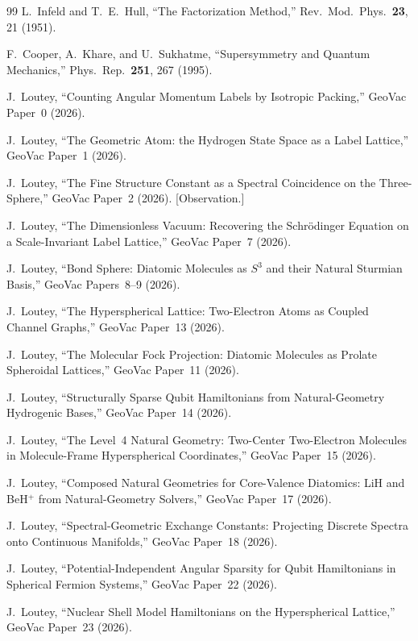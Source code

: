 \documentclass[twocolumn,pra,amsmath,amssymb,superscriptaddress]{revtex4-2}
\begin{document}
\begin{thebibliography}{99}
L.~Infeld and T.~E.~Hull,
``The Factorization Method,''
Rev.\ Mod.\ Phys.\ \textbf{23}, 21 (1951).

F.~Cooper, A.~Khare, and U.~Sukhatme,
``Supersymmetry and Quantum Mechanics,''
Phys.\ Rep.\ \textbf{251}, 267 (1995).

J.~Loutey,
``Counting Angular Momentum Labels by Isotropic Packing,''
GeoVac Paper~0 (2026).

J.~Loutey,
``The Geometric Atom: the Hydrogen State Space as a Label Lattice,''
GeoVac Paper~1 (2026).

J.~Loutey,
``The Fine Structure Constant as a Spectral Coincidence on the
Three-Sphere,''
GeoVac Paper~2 (2026). [Observation.]

J.~Loutey,
``The Dimensionless Vacuum: Recovering the Schr\"odinger Equation
on a Scale-Invariant Label Lattice,''
GeoVac Paper~7 (2026).

J.~Loutey,
``Bond Sphere: Diatomic Molecules as $S^3$ and their Natural
Sturmian Basis,''
GeoVac Papers~8--9 (2026).

J.~Loutey,
``The Hyperspherical Lattice: Two-Electron Atoms as Coupled
Channel Graphs,''
GeoVac Paper~13 (2026).

J.~Loutey,
``The Molecular Fock Projection: Diatomic Molecules as Prolate
Spheroidal Lattices,''
GeoVac Paper~11 (2026).

J.~Loutey,
``Structurally Sparse Qubit Hamiltonians from Natural-Geometry Hydrogenic
Bases,''
GeoVac Paper~14 (2026).

J.~Loutey,
``The Level~4 Natural Geometry: Two-Center Two-Electron Molecules
in Molecule-Frame Hyperspherical Coordinates,''
GeoVac Paper~15 (2026).

J.~Loutey,
``Composed Natural Geometries for Core-Valence Diatomics: LiH and
BeH$^+$ from Natural-Geometry Solvers,''
GeoVac Paper~17 (2026).

J.~Loutey,
``Spectral-Geometric Exchange Constants: Projecting Discrete Spectra
onto Continuous Manifolds,''
GeoVac Paper~18 (2026).

J.~Loutey,
``Potential-Independent Angular Sparsity for Qubit Hamiltonians in
Spherical Fermion Systems,''
GeoVac Paper~22 (2026).

J.~Loutey,
``Nuclear Shell Model Hamiltonians on the Hyperspherical Lattice,''
GeoVac Paper~23 (2026).


\end{thebibliography}
\end{document}
